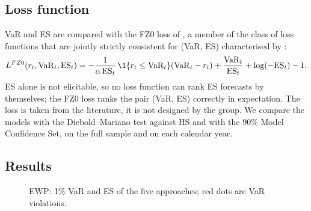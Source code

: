 \subsection{Loss function}
VaR and ES are compared with the FZ0 loss of \citet{patton2019}, a member of the class of loss functions that are
jointly strictly consistent for (VaR, ES) characterised by \citet{fissler2016}:
\begin{equation}\label{eq:fz0}
  L^{FZ0}(r_t,\VaR_t,\ES_t) = -\frac{1}{\alpha\,\ES_t}\,\1\{r_t\le\VaR_t\}(\VaR_t - r_t) + \frac{\VaR_t}{\ES_t} + \log(-\ES_t) - 1 .
\end{equation}
ES alone is not elicitable, so no loss function can rank ES forecasts by themselves; the FZ0 loss ranks the pair
(VaR, ES) correctly in expectation. The loss is taken from the literature, it is not designed by the group.
We compare the models with the Diebold--Mariano test against HS and with the 90\% Model Confidence Set, on the full
sample and on each calendar year.

\subsection{Results}
\begin{figure}[H]\centering
{}
\caption{EWP: 1\% VaR and ES of the five approaches; red dots are VaR violations.}\label{fig:es_EWP}
\end{figure}
